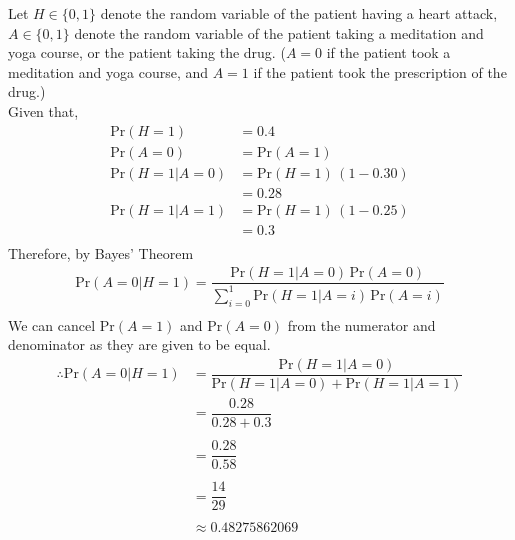 Let $H \in \{ 0, 1\}$ denote the random variable of the patient having a heart attack, $A \in \{ 0, 1\} $ denote the random variable of the patient taking a meditation and yoga course, or the patient taking the drug. ($A=0$ if the patient took a meditation and yoga course, and $A=1$ if the patient took the prescription of the drug.)\\
Given that,
\begin{align}
\text{Pr}(H=1) &= 0.4 \\
\text{Pr}(A=0) &= \text{Pr}(A=1)\\
\text{Pr}(H=1|A=0) &= \text{Pr}(H=1)\,(1-0.30)\\
&= 0.28 \\
\text{Pr}(H=1|A=1) &= \text{Pr}(H=1)\,(1-0.25)\\
&= 0.3\\
\end{align}
Therefore, by Bayes' Theorem
\begin{align}
\text{Pr}(A=0|H=1) = \dfrac{\text{Pr}(H=1|A=0)\,\text{Pr}(A=0)}{\sum_{i=0} ^ 1 \text{Pr}(H=1|A=i)\,\text{Pr}(A=i)} \\
\end{align}
We can cancel $\text{Pr}(A=1)$ and $\text{Pr}(A=0)$ from the numerator and denominator as they are given to be equal.\\
\begin{align}
\therefore \text{Pr}(A=0|H=1) &= \dfrac{\text{Pr}(H=1|A=0)}{\text{Pr}(H=1|A=0) + \text{Pr}(H=1|A=1)} \\
&= \dfrac{0.28}{0.28 + 0.3} \\ ~\\[-1em]
&= \dfrac{0.28}{0.58} \\ ~\\[-1em]
&= \dfrac{14}{29} \\ ~\\[-1em]
&\approx 0.48275862069
\end{align}